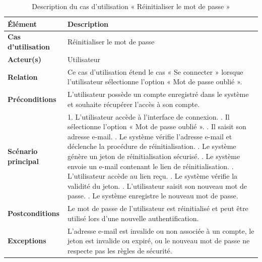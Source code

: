\begin{longtable}{|>{\raggedright\arraybackslash}p{4cm}|>{\raggedright\arraybackslash}p{10.5cm}|}

\caption{Description du cas d’utilisation « Réinitialiser le mot de passe »}
\label{tab:uc2}\\

\hline

\textbf{Élément} & \textbf{Description} \\

\hline

\textbf{Cas d’utilisation} & Réinitialiser le mot de passe \\

\hline

\textbf{Acteur(s)} & Utilisateur \\

\hline

\textbf{Relation} &
Ce cas d’utilisation étend le cas « Se connecter » lorsque l’utilisateur sélectionne l’option « Mot de passe oublié ». \\

\hline

\textbf{Préconditions} &
L'utilisateur possède un compte enregistré dans le système et souhaite récupérer l'accès à son compte. \\

\hline

\textbf{Scénario principal} &

1. L'utilisateur accède à l'interface de connexion. \newline
2. Il sélectionne l'option « Mot de passe oublié ». \newline
3. Il saisit son adresse e-mail. \newline
4. Le système vérifie l'adresse e-mail et déclenche la procédure de réinitialisation. \newline
5. Le système génère un jeton de réinitialisation sécurisé. \newline
6. Le système envoie un e-mail contenant le lien de réinitialisation. \newline
7. L'utilisateur accède au lien reçu. \newline
8. Le système vérifie la validité du jeton. \newline
9. L'utilisateur saisit son nouveau mot de passe. \newline
10. Le système enregistre le nouveau mot de passe. \\

\hline

\textbf{Postconditions} &
Le mot de passe de l'utilisateur est réinitialisé et peut être utilisé lors d'une nouvelle authentification. \\

\hline

\textbf{Exceptions} &
L'adresse e-mail est invalide ou non associée à un compte, le jeton est invalide ou expiré, ou le nouveau mot de passe ne respecte pas les règles de sécurité. \\

\hline

\end{longtable}

